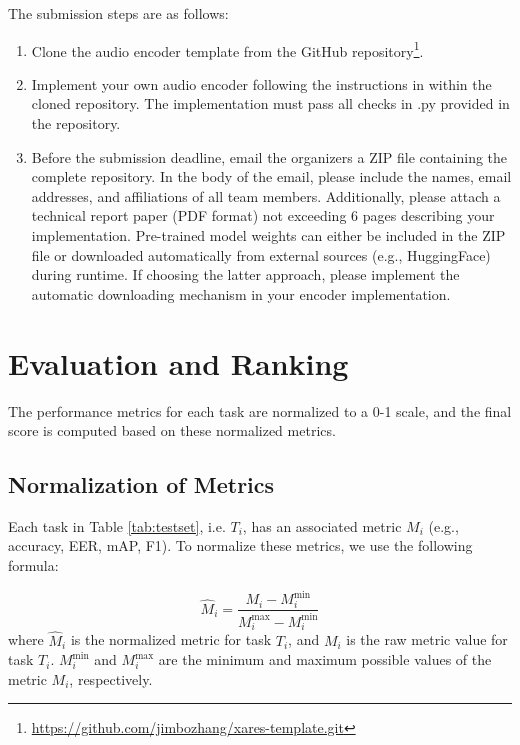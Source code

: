 \documentclass{article}
\begin{document}
The submission steps are as follows:
\begin{enumerate}
\setlength{\parskip}{0pt}
    \item Clone the audio encoder template from the GitHub repository\footnote{\url{https://github.com/jimbozhang/xares-template.git}}.
    \item Implement your own audio encoder following the instructions in  within the cloned repository. The implementation must pass all checks in .py provided in the repository.
    \item Before the submission deadline, email the organizers a ZIP file containing the complete repository. In the body of the email, please include the names, email addresses, and affiliations of all team members. Additionally, please attach a technical report paper (PDF format) not exceeding 6 pages describing your implementation. Pre-trained model weights can either be included in the ZIP file or downloaded automatically from external sources (e.g., HuggingFace) during runtime. If choosing the latter approach, please implement the automatic downloading mechanism in your encoder implementation.
\end{enumerate}


\section{Evaluation and Ranking}

The performance metrics for each task are normalized to a 0-1 scale, and the final score is computed based on these normalized metrics.

\subsection{Normalization of Metrics}

Each task in Table \ref{tab:testset}, i.e. $ T_i $, has an associated metric $ M_i $ (e.g., accuracy, EER, mAP, F1). To normalize these metrics, we use the following formula:

\begin{equation}
    \hat{M}_i = \frac{M_i - M_i^{\text{min}}}{M_i^{\text{max}} - M_i^{\text{min}}}
\end{equation}
where $ \hat{M}_i $ is the normalized metric for task $ T_i $, and $ M_i $ is the raw metric value for task $ T_i $.
$ M_i^{\text{min}} $ and $ M_i^{\text{max}} $ are the minimum and maximum possible values of the metric $ M_i $, respectively.
\end{document}
